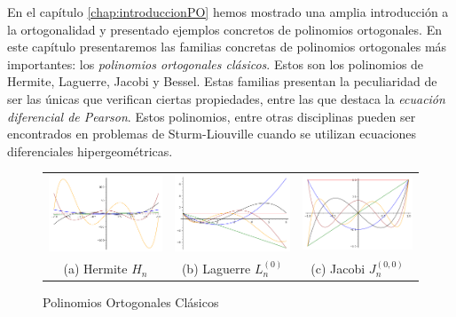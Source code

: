 


En el capítulo \ref{chap:introduccionPO} hemos mostrado una amplia introducción a la ortogonalidad y presentado ejemplos concretos de polinomios ortogonales. En este capítulo presentaremos las familias concretas de polinomios ortogonales más importantes: los \textit{polinomios ortogonales clásicos}. Estos son los polinomios de Hermite, Laguerre, Jacobi y Bessel. Estas familias presentan la peculiaridad de ser las únicas que verifican ciertas propiedades, entre las que destaca la \textit{ecuación diferencial de Pearson}. Estos polinomios, entre otras disciplinas pueden ser encontrados en problemas de Sturm-Liouville cuando se utilizan ecuaciones diferenciales hipergeométricas.

\begin{figure}[h]
    \centering
    \begin{tabular}{ccc}
        \includegraphics[width=5cm]{img/C2/hermite.png} & 
        \includegraphics[width=5cm]{img/C2/laguerre.png} &
        \includegraphics[width=5cm]{img/C2/jacobi.png} \\
        (a) Hermite $H_n$ & (b) Laguerre $L^{(0)}_n$ & (c) Jacobi $J^{(0,0)}_n$ 
    \end{tabular}
    \caption{Polinomios Ortogonales Clásicos}
    \label{img:graficas-clasicos}
\end{figure}

